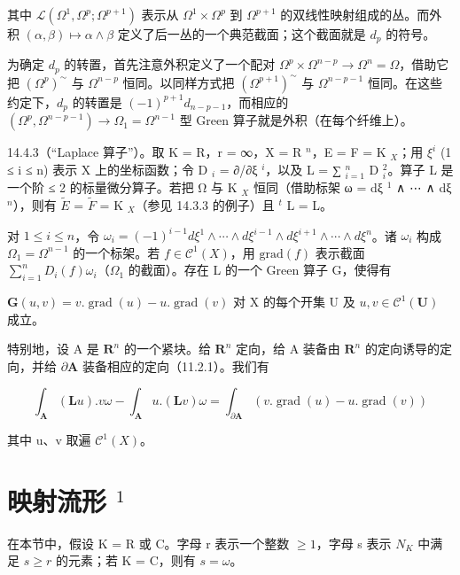 其中 \(\mathcal{L}(\Omega^{1},\Omega^{p};\Omega^{p+1})\) 表示从 \(\Omega^{1}\times\Omega^{p}\) 到 \(\Omega^{p+1}\) 的双线性映射组成的丛。而外积 \((\alpha,\beta)\mapsto\alpha\wedge\beta\) 定义了后一丛的一个典范截面；这个截面就是 \(d_{p}\) 的符号。

为确定 \(d_{p}\) 的转置，首先注意外积定义了一个配对 \(\Omega^{p} \times \Omega^{n-p} \to \Omega^{n} = \Omega\)，借助它把 \((\Omega^{p})^{\sim}\) 与 \(\Omega^{n-p}\) 恒同。以同样方式把 \((\Omega^{p+1})^{\sim}\) 与 \(\Omega^{n-p-1}\) 恒同。在这些约定下，\(d_{p}\) 的转置是 \((-1)^{p+1}d_{n-p-1}\)，而相应的 \((\Omega^{p}, \Omega^{n-p-1}) \to \Omega_{1} = \Omega^{n-1}\) 型 Green 算子就是外积（在每个纤维上）。

14.4.3（“Laplace 算子”）。取 K = R，r = ∞，X = R \(^{n}\)，E = F = K \(_{X}\)；用 \(\xi^{i}\) (1 ≤ i ≤ n) 表示 X 上的坐标函数；令 D \(_{i}\) = ∂/∂ξ \(^{i}\)，以及 L = ∑ \(_{i=1}^{n}\) D \(_{i}^{2}\)。算子 L 是一个阶 ≤ 2 的标量微分算子。若把 Ω 与 K \(_{X}\) 恒同（借助标架 ω = dξ \(^{1}\) ∧ ⋯ ∧ dξ \(^{n}\)），则有 \(\tilde{E}\) = \(\tilde{F}\) = K \(_{X}\)（参见 14.3.3 的例子）且 \(^{t}\) L = L。

对 \(1 \leqslant i \leqslant n\)，令 \(\omega_{i} = (-1)^{i-1} d\xi^{1} \wedge \cdots \wedge d\xi^{i-1} \wedge d\xi^{i+1} \wedge \cdots \wedge d\xi^{n}\)。诸 \(\omega_{i}\) 构成 \(\Omega_{1} = \Omega^{n-1}\) 的一个标架。若 \(f \in \mathcal{C}^{1}(X)\)，用 \(\text{grad}(f)\) 表示截面 \(\sum_{i=1}^{n} D_{i}(f)\omega_{i}\)（\(\Omega_{1}\) 的截面）。存在 L 的一个 Green 算子 G，使得有

\(\mathbf{G}(u,v) = v.\operatorname{grad}(u) - u.\operatorname{grad}(v)\) 对 X 的每个开集 U 及 \(u,v \in \mathcal{C}^{1}(\mathbf{U})\) 成立。

特别地，设 A 是 \(\mathbf{R}^{n}\) 的一个紧块。给 \(\mathbf{R}^{n}\) 定向，给 A 装备由 \(\mathbf{R}^{n}\) 的定向诱导的定向，并给 \(\partial\mathbf{A}\) 装备相应的定向（11.2.1）。我们有

\[
\int_ {\mathbf {A}} (\mathbf {L} u). v \omega - \int_ {\mathbf {A}} u. (\mathbf {L} v) \omega = \int_ {\partial \mathbf {A}} (v. \operatorname{grad} (u) - u. \operatorname{grad} (v))
\]

其中 u、v 取遍 \(\mathcal{C}^{1}(X)\)。

\section{\texorpdfstring{映射流形 \(^{1}\)}{映射流形 ¹}}

在本节中，假设 K = R 或 C。字母 r 表示一个整数 \(\geqslant 1\)，字母 s 表示 \(N_{K}\) 中满足 \(s \geqslant r\) 的元素；若 K = C，则有 \(s = \omega\)。

